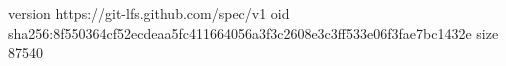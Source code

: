 version https://git-lfs.github.com/spec/v1
oid sha256:8f550364cf52ecdeaa5fc411664056a3f3c2608e3c3ff533e06f3fae7bc1432e
size 87540
